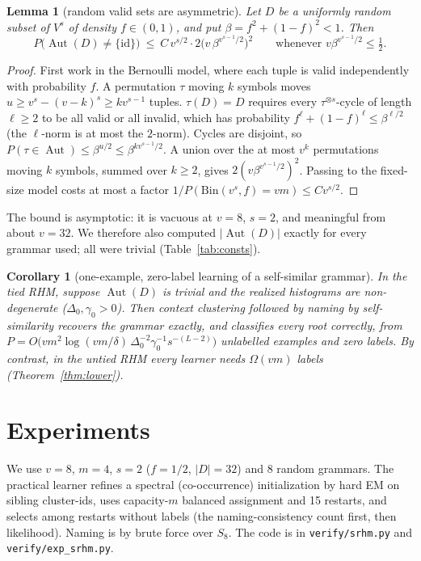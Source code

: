 \documentclass[11pt]{article}
\newtheorem{lemma}[theorem]{Lemma}
\newtheorem{corollary}[theorem]{Corollary}
\theoremstyle{definition}
\newcommand{\Aut}{\operatorname{Aut}}
\begin{document}
\begin{lemma}[random valid sets are asymmetric]\label{lem:aut}
Let $D$ be a uniformly random subset of $V^s$ of density $f\in(0,1)$, and put
$\beta=f^2+(1-f)^2<1$. Then
\[
P\big(\Aut(D)\ne\{\mathrm{id}\}\big)\ \le\ C\,v^{s/2}\cdot 2\big(v\,\beta^{v^{s-1}/2}\big)^2
\qquad\text{whenever } v\beta^{v^{s-1}/2}\le\tfrac12 .
\]
\end{lemma}
\begin{proof}
First work in the Bernoulli model, where each tuple is valid independently with probability
$f$. A permutation $\tau$ moving $k$ symbols moves $u\ge v^s-(v-k)^s\ge kv^{s-1}$ tuples.
$\tau(D)=D$ requires every $\tau^{\otimes s}$-cycle of length $\ell\ge2$ to be all valid or all
invalid, which has probability $f^\ell+(1-f)^\ell\le\beta^{\ell/2}$ (the $\ell$-norm is at most
the $2$-norm). Cycles are disjoint, so $P(\tau\in\Aut)\le\beta^{u/2}\le\beta^{kv^{s-1}/2}$.
A union over the at most $v^k$ permutations moving $k$ symbols, summed over $k\ge2$, gives
$2(v\beta^{v^{s-1}/2})^2$. Passing to the fixed-size model costs at most a factor
$1/P(\mathrm{Bin}(v^s,f)=vm)\le Cv^{s/2}$.
\end{proof}
\noindent The bound is asymptotic: it is vacuous at $v=8$, $s=2$, and meaningful from about
$v=32$. We therefore also computed $|\Aut(D)|$ exactly for every grammar used; all were trivial
(Table~\ref{tab:consts}).

\begin{corollary}[one-example, zero-label learning of a self-similar grammar]\label{cor:main}
In the tied RHM, suppose $\Aut(D)$ is trivial and the realized histograms are non-degenerate
($\Delta_0,\gamma_0>0$). Then context clustering followed by naming by self-similarity recovers
the grammar exactly, and classifies every root correctly, from
$P=O\big(vm^2\log(vm/\delta)\,\Delta_0^{-2}\gamma_0^{-1}s^{-(L-2)}\big)$ unlabelled examples
and zero labels. By contrast, in the untied RHM every learner needs $\Omega(vm)$ labels
(Theorem~\ref{thm:lower}).
\end{corollary}

\section{Experiments}
We use $v=8$, $m=4$, $s=2$ ($f=1/2$, $|D|=32$) and 8 random grammars. The practical learner
refines a spectral (co-occurrence) initialization by hard EM on sibling cluster-ids, uses
capacity-$m$ balanced assignment and 15 restarts, and selects among restarts without labels (the
naming-consistency count first, then likelihood). Naming is by brute force over $S_8$. The code
is in \texttt{verify/srhm.py} and \texttt{verify/exp\_srhm.py}.
\end{document}
